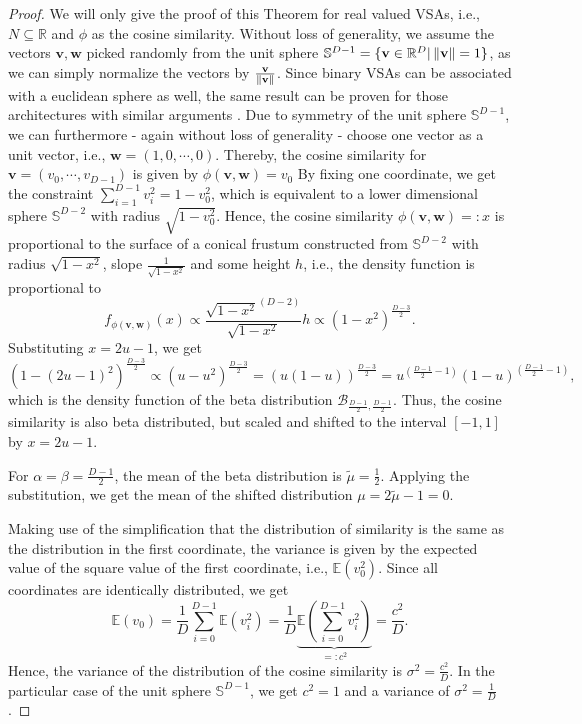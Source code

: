 \begin{proof}
	We will only give the proof of this Theorem for real valued \acp{VSA}, i.e., $N \subseteq \mathbb{R}$ and $\phi$ as the cosine similarity.
	Without loss of generality, we assume the vectors $ \mathbf{v}, \mathbf{w}$ picked randomly from the unit sphere $\mathbb{S}^{D-1} = \{ \mathbf{v} \in \mathbb{R}^{D} | \left\|  \mathbf{v} \right\| = 1 \}$, as we can simply normalize the vectors by $\frac{ \mathbf{v}}{\left\|  \mathbf{v} \right\|}$.
    Since binary \acp{VSA} can be associated with a euclidean sphere as well, the same result can be proven for those architectures with similar arguments \parencite[see][for details]{Kanerva1988}.
	Due to symmetry of the unit sphere $\mathbb{S}^{D-1}$, we can furthermore - again without loss of generality - choose one vector as a unit vector, i.e., $ \mathbf{w}=\left(1, 0 , \cdots, 0\right)$.
	Thereby, the cosine similarity for $ \mathbf{v}=\left(v_{0}, \cdots, v_{D-1}\right)$ is given by $\phi\left( \mathbf{v}, \mathbf{w}\right) = v_{0}$
	By fixing one coordinate, we get the constraint $\sum_{i=1}^{D-1} v_{i}^{2} = 1-v_{0}^{2}$, which is equivalent to a lower dimensional sphere $\mathbb{S}^{D-2}$ with radius $\sqrt{1-v_{0}^2}$.
	Hence, the cosine similarity $\phi\left( \mathbf{v}, \mathbf{w}\right)=:x$ is proportional to the surface of a conical frustum constructed from $\mathbb{S}^{D-2}$ with radius $\sqrt{1-x^{2}}$, slope $\frac{1}{\sqrt{1-x^{2}}}$ and some height $h$, i.e., the density function is proportional to
	\[
	f_{\phi( \mathbf{v}, \mathbf{w})}(x) \propto \frac{\sqrt{1-x^{2}}^{(D-2)}}{\sqrt{1-x^{2}}} h \propto \left(1-x^{2}\right)^{\frac{D-3}{2}}.
	\]
	Substituting $x=2u-1$, we get
	\[
	\left(1-\left(2u-1\right)^{2}\right)^{\frac{D-3}{2}} \propto \left(u-u^2\right)^{\frac{D-3}{2}} = \left(u \left(1-u\right)\right)^{\frac{D-3}{2}} = u^{\left(\frac{D-1}{2}-1\right)} \left(1-u\right)^{\left(\frac{D-1}{2}-1\right)},
	\]
	which is the density function of the beta distribution $\mathcal{B}_{\frac{D-1}{2},\frac{D-1}{2}}$.
	Thus, the cosine similarity is also beta distributed, but scaled and shifted to the interval $\left[-1,1\right]$ by $x=2u-1$.
    
	For $\alpha=\beta=\frac{D-1}{2}$, the mean of the beta distribution is $\tilde{\mu}=\frac{1}{2}$. Applying the substitution, we get the mean of the shifted distribution $\mu = 2\tilde{\mu }-1 = 0$.
    
	Making use of the simplification that the distribution of similarity is the same as the distribution in the first coordinate, the variance is given by the expected value of the square value of the first coordinate, i.e., $\mathbb{E}(v_{0}^{2})$.
	Since all coordinates are identically distributed, we get
	\[
	\mathbb{E}(v_{0}) = \frac{1}{D} \sum_{i=0}^{D-1} \mathbb{E}(v_{i}^2)= \frac{1}{D} \underbrace{\mathbb{E}\left(\sum_{i=0}^{D-1} v_{i}^2\right)}_{=:c^2}=\frac{c^2}{D}.
	\]
	Hence, the variance of the distribution of the cosine similarity is $\sigma^2=\frac{c^2}{D}$.
	In the particular case of the unit sphere $\mathbb{S}^{D-1}$, we get $c^{2}=1$ and a variance of $\sigma^2=\frac{1}{D}$.
    

\end{proof}
